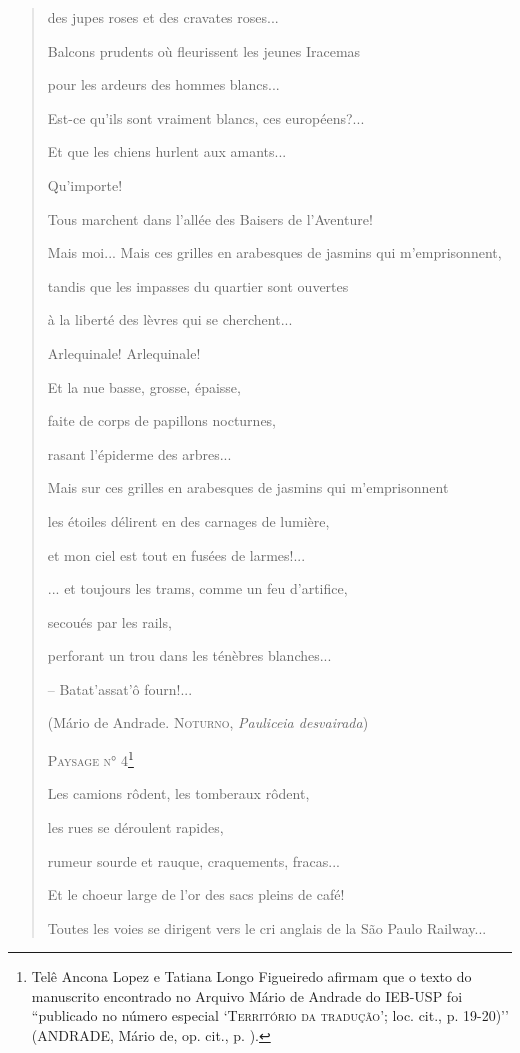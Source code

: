 \begin{verse}
des jupes roses et des cravates roses...

Balcons prudents où fleurissent les jeunes Iracemas

pour les ardeurs des hommes blancs...

Est-ce qu'ils sont vraiment blancs, ces européens?...

Et que les chiens hurlent aux amants...

Qu'importe!

Tous marchent dans l'allée des Baisers de l'Aventure!

Mais moi... Mais ces grilles en arabesques de jasmins qui
m'emprisonnent,

tandis que les impasses du quartier sont ouvertes

à la liberté des lèvres qui se cherchent...

Arlequinale! Arlequinale!

Et la nue basse, grosse, épaisse,

faite de corps de papillons nocturnes,

rasant l'épiderme des arbres...

Mais sur ces grilles en arabesques de jasmins qui m'emprisonnent

les étoiles délirent en des carnages de lumière,

et mon ciel est tout en fusées de larmes!...

... et toujours les trams, comme un feu d'artifice,

secoués par les rails,

perforant un trou dans les ténèbres blanches...

-- Batat'assat'ô fourn!...

(Mário de Andrade\textsc{. Noturno,} \emph{Pauliceia
desvairada}\textsc{)}

\textsc{Paysage n° 4}\footnote{Telê Ancona Lopez e Tatiana Longo
  Figueiredo afirmam que o texto do manuscrito encontrado no Arquivo
  Mário de Andrade do IEB-USP foi ``publicado no número especial
  `\textsc{Território da tradução'}; loc. cit., p. 19-20)'' (ANDRADE,
  Mário de, op. cit., p. ).}

Les camions rôdent, les tomberaux rôdent,

les rues se déroulent rapides,

rumeur sourde et rauque, craquements, fracas...

Et le choeur large de l'or des sacs pleins de café!

Toutes les voies se dirigent vers le cri anglais de la São Paulo
Railway...


\end{verse}
